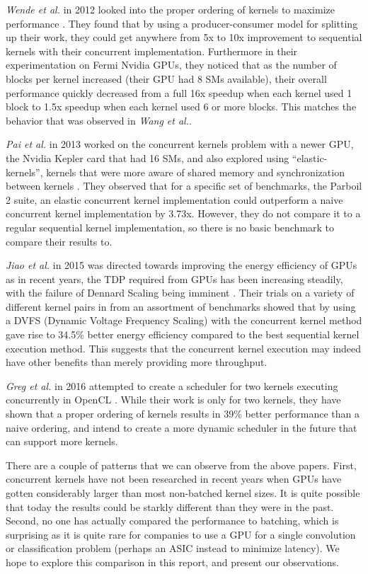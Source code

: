 \documentclass[sigconf]{acmart}
\begin{document}
\textit{Wende et al.} in 2012 looked into the proper ordering of kernels to maximize performance \cite{wende_cordes_steinke_2012}. They found that by using a producer-consumer model for splitting up their work, they could get anywhere from 5x to 10x improvement to sequential kernels with their concurrent implementation. Furthermore in their experimentation on Fermi Nvidia GPUs, they noticed that as the number of blocks per kernel increased (their GPU had 8 SMs available), their overall performance quickly decreased from a full 16x speedup when each kernel used 1 block to 1.5x speedup when each kernel used 6 or more blocks. This matches the behavior that was observed in \textit{Wang et al.}.

\textit{Pai et al.} in 2013 worked on the concurrent kernels problem with a newer GPU, the Nvidia Kepler card that had 16 SMs, and also explored using “elastic-kernels”, kernels that were more aware of shared memory and synchronization between kernels \cite{pai_thazhuthaveetil_govindarajan_2013}. They observed that for a specific set of benchmarks, the Parboil 2 suite, an elastic concurrent kernel implementation could outperform a naive concurrent kernel implementation by 3.73x. However, they do not compare it to a regular sequential kernel implementation, so there is no basic benchmark to compare their results to. 

\textit{Jiao et al.} in 2015 was directed towards improving the energy efficiency of GPUs as in recent years, the TDP required from GPUs has been increasing steadily, with the failure of Dennard Scaling being imminent \cite{jiao_lu_huynh_mitra_2015}. Their trials on a variety of different kernel pairs in from an assortment of benchmarks showed that by using a DVFS (Dynamic Voltage Frequency Scaling) with the concurrent kernel method gave rise to 34.5\% better energy efficiency compared to the best sequential kernel execution method. This suggests that the concurrent kernel execution may indeed have other benefits than merely providing more throughput. 

\textit{Greg et al.} in 2016 attempted to create a scheduler for two kernels executing concurrently in OpenCL \cite{gregg_dorn_hazelwood_skadron_2016}. While their work is only for two kernels, they have shown that a proper ordering of kernels results in 39\% better performance than a naive ordering, and intend to create a more dynamic scheduler in the future that can support more kernels. 

There are a couple of patterns that we can observe from the above papers. First, concurrent kernels have not been researched in recent years when GPUs have gotten considerably larger than most non-batched kernel sizes. It is quite possible that today the results could be starkly different than they were in the past. Second, no one has actually compared the performance to batching, which is surprising as it is quite rare for companies to use a GPU for a single convolution or classification problem (perhaps an ASIC instead to minimize latency). We hope to explore this comparison in this report, and present our observations.
\end{document}
